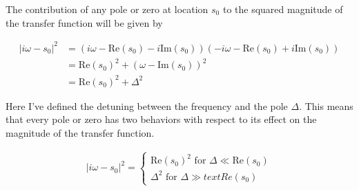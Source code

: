 \documentclass[12pt]{article}
\begin{document}
The contribution of any pole or zero at location $s_0$ to the squared magnitude of the transfer function will be given by

\begin{align}
|i\omega - s_0|^2 &= (i\omega - \text{Re}(s_0) - i \text{Im}(s_0))(-i\omega - \text{Re}(s_0) + i \text{Im}(s_0))\\
&= \text{Re}(s_0)^2 + (\omega - \text{Im}(s_0))^2\\
&= \text{Re}(s_0)^2 + \Delta^2
\end{align}

Here I've defined the detuning between the frequency and the pole $\Delta$.
This means that every pole or zero has two behaviors with respect to its effect on the magnitude of the transfer function.

\begin{align}
|i \omega - s_0|^2 = 
\begin{cases}
\text{Re}(s_0)^2 \text{ for } \Delta \ll \text{Re}(s_0)\\
\Delta^2 \text{ for } \Delta \gg text{Re}(s_0)
\end{cases}
\end{align}
\end{document}
